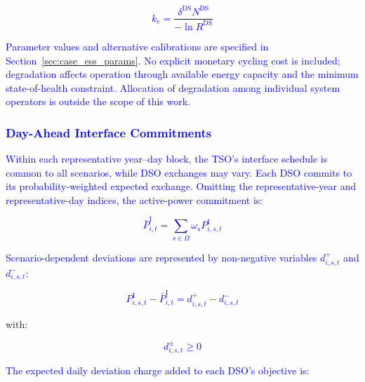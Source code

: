 \documentclass[preprint,12pt]{elsarticle}
\begin{document}
\textcolor{blue}{
    \begin{equation}
        k_e = \frac{\delta^{\text{DS}} N^{\text{DS}}}{-\ln R^{\text{DS}}}
        \label{eq:cycle_life_calibration}
    \end{equation}
}

\textcolor{blue}{
    Parameter values and alternative calibrations are specified in Section~\ref{sec:case_ess_params}.
    No explicit monetary cycling cost is included; degradation affects operation through available energy capacity and the minimum state-of-health constraint. Allocation of degradation among individual system operators is outside the scope of this work.
}

\subsubsection{\textcolor{blue}{Day-Ahead Interface Commitments}}
\label{subsubsec:commitment}

\textcolor{blue}{
    Within each representative year--day block, the TSO's interface schedule is common to all scenarios, while DSO exchanges may vary. Each DSO commits to its probability-weighted expected exchange. Omitting the representative-year and representative-day indices, the active-power commitment is:
}

\textcolor{blue}{
    \begin{equation}
        \bar{P}^{\text{I}}_{i,t}
        =
        \sum_{s\in\Omega}
        \omega_s P^{\text{I}}_{i,s,t}
        \label{eq:commitment_deviation}
    \end{equation}
}

\textcolor{blue}{
    Scenario-dependent deviations are represented by non-negative variables $d^{+}_{i,s,t}$ and $d^{-}_{i,s,t}$:
}

\textcolor{blue}{
    \begin{equation}
        P^{\text{I}}_{i,s,t}
        -
        \bar{P}^{\text{I}}_{i,t}
        =
        d^{+}_{i,s,t}
        -
        d^{-}_{i,s,t}
        \label{eq:interface_deviation}
    \end{equation}
}

\noindent
with:

\textcolor{blue}{
    \begin{equation}
        d^{\pm}_{i,s,t} \ge 0
        \label{eq:interface_deviation_nonnegative}
    \end{equation}
}

\textcolor{blue}{
    The expected daily deviation charge added to each DSO's objective is:
}
\end{document}
